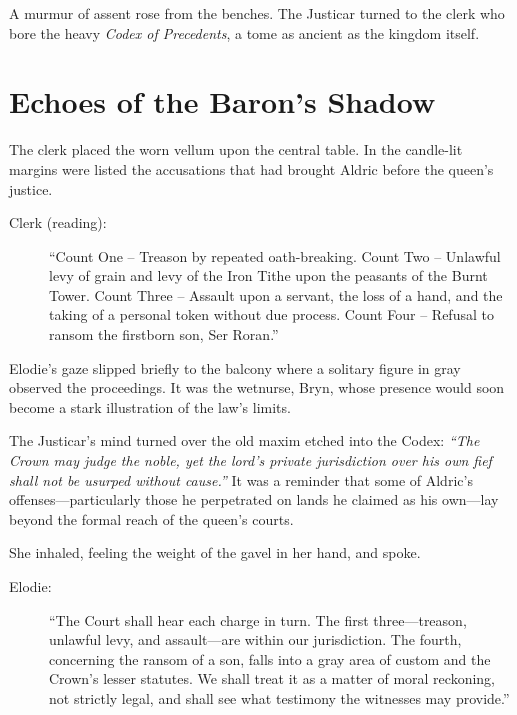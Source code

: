\documentclass[11pt,twoside]{book}
\begin{document}
A murmur of assent rose from the benches.  The Justicar turned to the clerk who bore the heavy \textit{Codex of Precedents}, a tome as ancient as the kingdom itself.

\newpage

\section*{Echoes of the Baron's Shadow}

The clerk placed the worn vellum upon the central table.  In the candle-lit margins were listed the accusations that had brought Aldric before the queen's justice.

\begin{description}
\item[Clerk (reading):] ``Count One -- Treason by repeated oath-breaking. Count Two -- Unlawful levy of grain and levy of the Iron Tithe upon the peasants of the Burnt Tower. Count Three -- Assault upon a servant, the loss of a hand, and the taking of a personal token without due process. Count Four -- Refusal to ransom the firstborn son, Ser Roran.''
\end{description}

Elodie's gaze slipped briefly to the balcony where a solitary figure in gray observed the proceedings.  It was the wetnurse, Bryn, whose presence would soon become a stark illustration of the law's limits.

The Justicar's mind turned over the old maxim etched into the Codex: \textit{``The Crown may judge the noble, yet the lord's private jurisdiction over his own fief shall not be usurped without cause.''}  It was a reminder that some of Aldric's offenses---particularly those he perpetrated on lands he claimed as his own---lay beyond the formal reach of the queen's courts.  

She inhaled, feeling the weight of the gavel in her hand, and spoke.

\begin{description}
\item[Elodie:] ``The Court shall hear each charge in turn. The first three---treason, unlawful levy, and assault---are within our jurisdiction. The fourth, concerning the ransom of a son, falls into a gray area of custom and the Crown's lesser statutes. We shall treat it as a matter of moral reckoning, not strictly legal, and shall see what testimony the witnesses may provide.''
\end{description}
\end{document}
